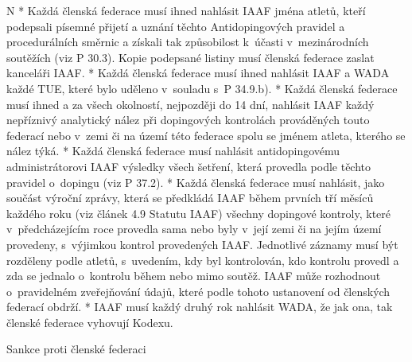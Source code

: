 \begitems \style N
* Každá členská federace musí ihned nahlásit IAAF jména atletů, kteří podepsali písemné přijetí a uznání těchto Antidopingových pravidel a procedurálních směrnic a získali tak způsobilost k~účasti v~mezinárodních soutěžích (viz P 30.3). Kopie podepsané listiny musí členská federace zaslat kanceláři IAAF.
* Každá členská federace musí ihned nahlásit IAAF a WADA každé TUE, které bylo uděleno v~souladu s~P 34.9.b).
* Každá členská federace musí ihned a za všech okolností, nejpozději do 14 dní, nahlásit IAAF každý nepříznivý analytický nález při dopingových kontrolách prováděných touto federací nebo v~zemi či na území této federace spolu se jménem atleta, kterého se nález týká.
* Každá členská federace musí nahlásit antidopingovému administrátorovi IAAF výsledky všech šetření, která provedla podle těchto pravidel o~dopingu (viz P 37.2).
* Každá členská federace musí nahlásit, jako součást výroční zprávy, která se předkládá IAAF během prvních tří měsíců každého roku (viz článek 4.9 Statutu IAAF) všechny dopingové kontroly, které v~předcházejícím roce provedla sama nebo byly v~její zemi či na jejím území provedeny, s~výjimkou kontrol provedených IAAF. Jednotlivé záznamy musí být rozděleny podle atletů, s~uvedením, kdy byl kontrolován, kdo kontrolu provedl a zda se jednalo o~kontrolu během nebo mimo soutěž. IAAF může rozhodnout o~pravidelném zveřejňování údajů, které podle tohoto ustanovení od členských federací obdrží.
* IAAF musí každý druhý rok nahlásit WADA, že jak ona, tak členské federace vyhovují Kodexu.
\enditems

\secc Sankce proti členské federaci

